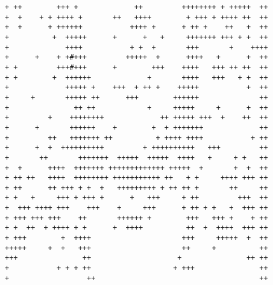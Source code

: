 \begin{Verbatim}[samepage=true]
+ ++        +++ +             ++         ++++++++ + +++++  ++
+  +    + + ++++ +       ++   ++++        + +++ + ++++ ++  ++
+  +      + ++++++           ++++ +      + ++ +    ++   +  ++
+          +  +++++      +      +   +     +++++++ +++ + +  ++
+             ++++           + +  +       +++       +    ++++
+      +    + +#+++         +++++  +      ++++   +      +  ++
+ +         +++#+++      +        +++    ++++   +++ ++ ++  ++
+ +        +  ++++++             +       ++++   +++   + +  ++
+             +++++ +    +++  + ++ +    +++++           +  ++
+     +       +++++ ++      +++        ++++++              ++
+               ++ ++            +     +++++     +      +  ++
+         +    ++++++++             ++ +++++ +++  +    ++  ++
+      +       ++++++    +        +  + +++++++             ++
+         ++   +++++++ ++          + ++++ ++++           + ++
+      +  +  ++++++++++         + ++++++++++   +++         ++
+       ++       +++++++  +++++  +++++  ++++   +     + +   ++
+  +      ++++  +++++++ +++++++++++++ +++++  +       +  +  ++
+ ++ ++   ++++  ++++++++ +++++++++++ ++   + +     ++++ +++ ++
+ ++      ++ +++ + +  +   +++++++++ + ++ ++ +       ++     ++
+ +   +     +++ + +++ +      +   +++     + ++         +++  ++
+  +++ ++++ +++    +++    +     +++      + ++ + +   +  +++ ++
+ +++ +++ +++    ++       ++++++ +        +++   +++ +    + ++
+ +  ++  + ++++ + +      +  ++++          ++  +  ++++  +++ ++
+ +++        +  ++++                     +++     +++++  +  ++
+++++     +  +   +++                     ++     +          ++
+++               ++                    +               ++ ++
+           + + + ++                   + +++               ++
+                  ++                                      ++
\end{Verbatim}